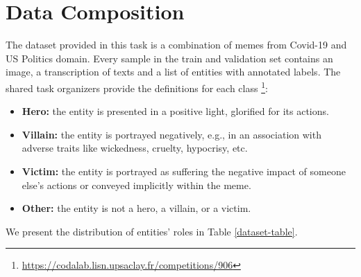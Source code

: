 \documentclass[11pt]{article}
\begin{document}
\section{Data Composition}

The dataset provided in this task is a combination of memes from Covid-19 and US Politics domain. Every sample in the train and validation set contains an image, a transcription of texts and a list of entities with annotated labels. The shared task organizers provide the definitions for each class \footnote{\url{https://codalab.lisn.upsaclay.fr/competitions/906}}:

\begin{itemize}
\item \textbf{Hero:} the entity is presented in a positive light, glorified for its actions.

\item \textbf{Villain:} the entity is portrayed negatively, e.g., in an association with adverse traits like wickedness, cruelty, hypocrisy, etc.

\item \textbf{Victim:} the entity is portrayed as suffering the negative impact of someone else's actions or conveyed implicitly within the meme.

\item \textbf{Other:} the entity is not a hero, a villain, or a victim.

\end{itemize}

We present the distribution of entities' roles in Table \ref{dataset-table}.
\end{document}
